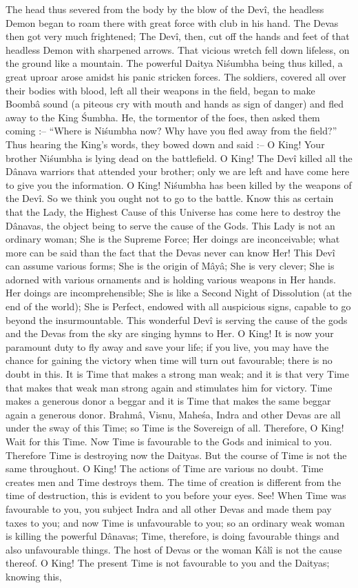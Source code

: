 The head thus severed from the body by the blow of the Dev\^i, the headless Demon began to roam there with great force with club in his hand. The Devas then got very much frightened; The Dev\^i, then, cut off the hands and feet of that headless Demon with sharpened arrows. That vicious wretch fell down lifeless, on the ground like a mountain. The powerful Daitya Ni\'sumbha being thus killed, a great uproar arose amidst his panic stricken forces. The soldiers, covered all over their bodies with blood, left all their weapons in the field, began to make Boomb\^a sound (a piteous cry with mouth and hands as sign of danger) and fled away to the King \'Sumbha. He, the tormentor of the foes, then asked them coming :-- ``Where is Ni\'sumbha now? Why have you fled away from the field?'' Thus hearing the King's words, they bowed down and said :-- O King! Your brother Ni\'sumbha is lying dead on the battlefield. O King! The Dev\^i killed all the D\^anava warriors that attended your brother; only we are left and have come here to give you the information. O King! Ni\'sumbha has been killed by the weapons of the Dev\^i. So we think you ought not to go to the battle. Know this as certain that the Lady, the Highest Cause of this Universe has come here to destroy the D\^anavas, the object being to serve the cause of the Gods. This Lady is not an ordinary woman; She is the Supreme Force; Her doings are inconceivable; what more can be said than the fact that the Devas never can know Her! This Dev\^i can assume various forms; She is the origin of M\^ay\^a; She is very clever; She is adorned with various ornaments and is holding various weapons in Her hands. Her doings are incomprehensible; She is like a Second Night of Dissolution (at the end of the world); She is Perfect, endowed with all auspicious signs, capable to go beyond the insurmountable. This wonderful Dev\^i is serving the cause of the gods and the Devas from the sky are singing hymns to Her. O King! It is now your paramount duty to fly away and save your life; if you live, you may have the chance for gaining the victory when time will turn out favourable; there is no doubt in this. It is Time that makes a strong man weak; and it is that very Time that makes that weak man strong again and stimulates him for victory. Time makes a generous donor a beggar and it is Time that makes the same beggar again a generous donor. Brahm\^a, Visnu, Mahe\'sa, Indra and other Devas are all under the sway of this Time; so Time is the Sovereign of all. Therefore, O King! Wait for this Time. Now Time is favourable to the Gods and inimical to you. Therefore Time is destroying now the Daityas. But the course of Time is not the same throughout. O King! The actions of Time are various no doubt. Time creates men and Time destroys them. The time of creation is different from the time of destruction, this is evident to you before your eyes. See! When Time was favourable to you, you subject Indra and all other Devas and made them pay taxes to you; and now Time is unfavourable to you; so an ordinary weak woman is killing the powerful D\^anavas; Time, therefore, is doing favourable things and also unfavourable things. The host of Devas or the woman K\^al\^i is not the cause thereof. O King! The present Time is not favourable to you and the Daityas; knowing this, 